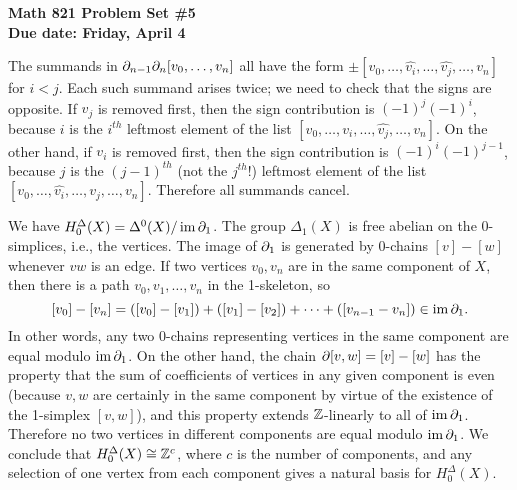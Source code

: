 
\usepackage{youngtab}

\thispagestyle{empty}
{\bf Math 821 Problem Set \#5\\
Due date: Friday, April 4}
\bigskip


\soln The summands in $\partial_{n-1} \partial_n [v_0,\dots,v_n]$ all have the form
$\pm  [v_0,\dots,\widehat{v_i},\dots,\widehat{v_j},\dots,v_n] $ for $i<j$.  Each such summand
arises twice; we need to check that the signs are opposite.  If $v_j$ is removed first, then the sign contribution is $(-1)^j (-1)^i$, because $i$ is the $i^{th}$ leftmost element of the list $[v_0,\dots,v_i,\dots,\widehat{v_j},\dots,v_n]$.
On the other hand, if $v_i$ is removed first, then the sign contribution is $(-1)^i (-1)^{j-1}$, because $j$ is the $(j-1)^{th}$ (not the $j^{th}$!) leftmost element of the list $[v_0,\dots,\widehat{v_i},\dots,v_j,\dots,v_n]$.  Therefore all summands cancel.


\soln We have $H^\Delta_0(X)=\Delta^0(X)/\operatorname{im}\partial_1$.  The group $\Delta_1(X)$ is free abelian on the 0-simplices, i.e., the vertices.  The image of $\partial_1$ is generated by 0-chains $[v]-[w]$  whenever $vw$ is an edge.  If two vertices $v_0,v_n$ are in the same component of $X$, then there is a path $v_0,v_1,\dots,v_n$ in the 1-skeleton, so
\[[v_0]-[v_n] = ([v_0]-[v_1])+([v_1]-[v_2])+\cdots+([v_{n-1}-v_n]) \in \operatorname{im}\partial_1.\]
In other words, any two 0-chains representing vertices in the same component are equal modulo $\operatorname{im}\partial_1$.  On the other hand, the chain $\partial[v,w]=[v]-[w]$ has the property that  the sum of coefficients of vertices in any given component is even (because $v,w$ are certainly in the same component by virtue of the existence of the 1-simplex $[v,w]$), and this property extends $\mathbb{Z}$-linearly to all of $\operatorname{im}\partial_1$.  Therefore no two vertices in different components are equal modulo $\operatorname{im}\partial_1$.  We conclude that $H^\Delta_0(X)\cong\mathbb{Z}^c$, where $c$ is the number of components, and any selection of one vertex from each component gives a natural basis for $H^\Delta_0(X)$.

